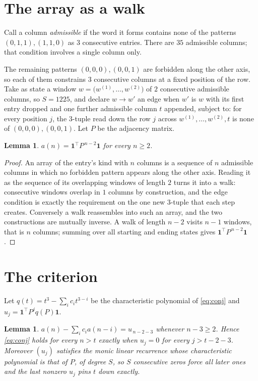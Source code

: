 \documentclass[11pt,a4paper]{article}
\theoremstyle{plain}
\newtheorem{lemma}[theorem]{Lemma}
\theoremstyle{definition}
\begin{document}
\section{The array as a walk}

Call a column \emph{admissible} if the word it forms contains none of the patterns
$(0,1,1), (1,1,0)$ as $3$ consecutive entries. There are $35$ admissible columns; that condition
involves a single column only.

The remaining patterns $(0,0,0), (0,0,1)$ are forbidden along the other axis, so each of them
constrains $3$ consecutive columns at a fixed position of the row. Take as state a
window $w=\bigl(w^{(1)},\dots,w^{(2)}\bigr)$ of $2$ consecutive admissible
columns, so $S=1225$, and declare $w\to w'$ an edge when $w'$ is $w$ with its first entry
dropped and one further admissible column $t$ appended, subject to: for every position
$j$, the $3$-tuple read down the row $j$ across $w^{(1)},\dots,w^{(2)},t$
is none of $(0,0,0), (0,0,1)$. Let $P$ be the adjacency matrix.

\begin{lemma}\label{lem:walk}
$a(n)=\mathbf{1}^{\!\top}P^{\,n-2}\mathbf{1}$ for every $n\ge2$.
\end{lemma}

\begin{proof}
An array of the entry's kind with $n$ columns is a sequence of $n$ admissible columns in
which no forbidden pattern appears along the other axis. Reading it as the sequence of its
overlapping windows of length $2$ turns it into a walk: consecutive windows overlap in
$1$ columns by construction, and the edge condition is exactly the requirement on the one
new $3$-tuple that each step creates. Conversely a walk reassembles into such an array,
and the two constructions are mutually inverse. A walk of length $n-2$ visits $n-1$
windows, that is $n$ columns; summing over all starting and ending states gives
$\mathbf{1}^{\!\top}P^{\,n-2}\mathbf{1}$.
\end{proof}

\section{The criterion}

Let $q(t)=t^{3}-\sum_i c_i t^{3-i}$ be the characteristic polynomial of
\eqref{eq:conj} and $u_j=\mathbf{1}^{\!\top}P^{j}q(P)\mathbf{1}$.

\begin{lemma}\label{lem:crit}
$a(n)-\sum_i c_i a(n-i)=u_{\,n-2-3}$ whenever $n-3\ge2$. Hence
\eqref{eq:conj} holds for every $n>t$ exactly when $u_j=0$ for every
$j>t-2-3$. Moreover $(u_j)$ satisfies the monic linear recurrence whose
characteristic polynomial is that of $P$, of degree $S$, so $S$ consecutive zeros force all
later ones and the last nonzero $u_j$ pins $t$ down exactly.
\end{lemma}
\end{document}
